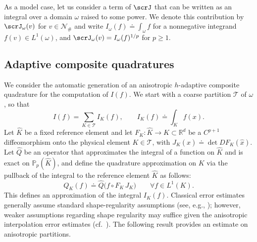 \documentclass[oneside,reqno,11pt,a4paper]{amsart}
\theoremstyle{definition}
\newtheorem{lemma}{Lemma}[section]
\begin{document}
As a model case, let us consider a term of $\scrJ$ that can be written as an
integral over a domain $\omega$ raised to some power. We denote this
contribution by $\scrJ_\omega(v)$ for $v \in \mathcal{N}_{\#}$ and write
$I_\omega(f) \doteq \int_{\omega}^{} f$ for a nonnegative integrand
$f(v) \in L^{1}(\omega)$, and $\scrJ_\omega(v) = I_\omega(f)^{1/p}$ for
$p \geq 1$.

\subsection{Adaptive composite quadratures}\label{subsec:anisotropic-adaptive-quadratures}
We consider the automatic generation of an anisotropic $h$-adaptive composite quadrature for the computation of $I(f)$. We start with a coarse partition $\mathcal{T}$ of $\omega$, so that
\[
I(f) = \sum_{K \in \mathcal{T}} I_K(f),
\qquad
I_K(f) \doteq \int_K f(x).
\]
Let $\widehat K$ 
be a fixed reference element and let
  $F_K : \widehat K \to K \subset \mathbb R^d$ be a $C^{p+1}$ diffeomorphism
  onto the physical element $K \in \mathcal{T}$, with $J_K(\hat x) \doteq \det DF_K(\hat x)$.
  Let $\widehat Q$ be an operator that approximates the integral of a function on $\widehat K$ and is exact on
  $\mathbb P_p(\widehat K)$, and define the quadrature approximation on $K$ via the pullback of the integral to the reference element $\widehat K$ as follows:
  \begin{equation}\label{eq:def-QK}
    Q_K(f)
    \doteq \widehat Q\bigl( f\circ F_K \, J_K \bigr)
    \qquad \forall f \in L^1(K).
  \end{equation}
This defines an approximation of the integral $I_K(f)$. Classical error
estimates generally assume standard shape-regularity assumptions (see, e.g.,
\cite[Lemma 30.9]{Ern-Guermond-FE-II}); however, weaker assumptions regarding
shape regularity may suffice given the anisotropic interpolation error
estimates (cf.~\cite{Acosta2006interpolation}). The following result provides
an estimate on anisotropic partitions. 
\end{document}
